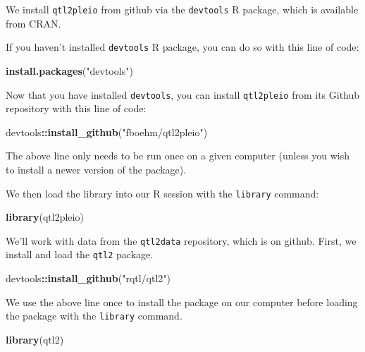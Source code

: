 \documentclass[oneside]{book}
\newenvironment{Shaded}{\begin{snugshade}}{\end{snugshade}}
\newcommand{\KeywordTok}[1]{\textcolor[rgb]{0.13,0.29,0.53}{\textbf{#1}}}
\newcommand{\NormalTok}[1]{#1}
\newcommand{\OperatorTok}[1]{\textcolor[rgb]{0.81,0.36,0.00}{\textbf{#1}}}
\newcommand{\StringTok}[1]{\textcolor[rgb]{0.31,0.60,0.02}{#1}}
\begin{document}
We install \texttt{qtl2pleio} from github via the \texttt{devtools} R
package, which is available from CRAN.

If you haven't installed \texttt{devtools} R package, you can do so with
this line of code:

\begin{Shaded}
\begin{Highlighting}[]
\KeywordTok{install.packages}\NormalTok{(}\StringTok{"devtools"}\NormalTok{)}
\end{Highlighting}
\end{Shaded}

Now that you have installed \texttt{devtools}, you can install
\texttt{qtl2pleio} from its Github repository with this line of code:

\begin{Shaded}
\begin{Highlighting}[]
\NormalTok{devtools}\OperatorTok{::}\KeywordTok{install_github}\NormalTok{(}\StringTok{"fboehm/qtl2pleio"}\NormalTok{)}
\end{Highlighting}
\end{Shaded}

The above line only needs to be run once on a given computer (unless you
wish to install a newer version of the package).

We then load the library into our R session with the \texttt{library}
command:

\begin{Shaded}
\begin{Highlighting}[]
\KeywordTok{library}\NormalTok{(qtl2pleio)}
\end{Highlighting}
\end{Shaded}

We'll work with data from the \texttt{qtl2data} repository, which is on
github. First, we install and load the \texttt{qtl2} package.

\begin{Shaded}
\begin{Highlighting}[]
\NormalTok{devtools}\OperatorTok{::}\KeywordTok{install_github}\NormalTok{(}\StringTok{"rqtl/qtl2"}\NormalTok{)}
\end{Highlighting}
\end{Shaded}

We use the above line once to install the package on our computer before
loading the package with the \texttt{library} command.

\begin{Shaded}
\begin{Highlighting}[]
\KeywordTok{library}\NormalTok{(qtl2)}
\end{Highlighting}
\end{Shaded}
\end{document}
